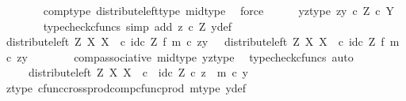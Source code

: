 \begin{isabellebody}
\ \ \ \ \ \ \isamarkupfalse%
\ comp{\isacharunderscore}{\kern0pt}type\ distribute{\isacharunderscore}{\kern0pt}left{\isacharunderscore}{\kern0pt}type\ mid{\isacharunderscore}{\kern0pt}type\ \isamarkupfalse%
\ force\isanewline
\ \ \ \ \isamarkupfalse%
\ yz{\isacharunderscore}{\kern0pt}type{\isacharcolon}{\kern0pt}\ {\isachardoublequoteopen}{\isasymlangle}z{\isacharcomma}{\kern0pt}y{\isasymrangle}\ {\isasymin}\isactrlsub c\ Z\ {\isasymtimes}\isactrlsub c\ Y{\isachardoublequoteclose}\isanewline
\ \ \ \ \ \ \isamarkupfalse%
\ {\isacharparenleft}{\kern0pt}typecheck{\isacharunderscore}{\kern0pt}cfuncs{\isacharcomma}{\kern0pt}\ simp\ add{\isacharcolon}{\kern0pt}\ {\isacartoucheopen}z\ {\isasymin}\isactrlsub c\ Z{\isacartoucheclose}\ y{\isacharunderscore}{\kern0pt}def{\isacharparenright}{\kern0pt}\isanewline
\ \ \ \ \isamarkupfalse%
\ {\isachardoublequoteopen}{\isacharparenleft}{\kern0pt}distribute{\isacharunderscore}{\kern0pt}left\ Z\ X\ X\ \ {\isasymcirc}\isactrlsub c\ {\isacharparenleft}{\kern0pt}id\isactrlsub c\ Z\ {\isasymtimes}\isactrlsub f\ m{\isacharparenright}{\kern0pt}{\isacharparenright}{\kern0pt}\ {\isasymcirc}\isactrlsub c\ {\isasymlangle}z{\isacharcomma}{\kern0pt}y{\isasymrangle}\ \ {\isacharequal}{\kern0pt}\ distribute{\isacharunderscore}{\kern0pt}left\ Z\ X\ X\ \ {\isasymcirc}\isactrlsub c\ {\isacharparenleft}{\kern0pt}id\isactrlsub c\ Z\ {\isasymtimes}\isactrlsub f\ m{\isacharparenright}{\kern0pt}\ {\isasymcirc}\isactrlsub c\ {\isasymlangle}z{\isacharcomma}{\kern0pt}y{\isasymrangle}{\isachardoublequoteclose}\isanewline
\ \ \ \ \ \ \isamarkupfalse%
\ comp{\isacharunderscore}{\kern0pt}associative{}\ mid{\isacharunderscore}{\kern0pt}type\ yz{\isacharunderscore}{\kern0pt}type\ \isamarkupfalse%
\ {\isacharparenleft}{\kern0pt}typecheck{\isacharunderscore}{\kern0pt}cfuncs{\isacharcomma}{\kern0pt}\ auto{\isacharparenright}{\kern0pt}\isanewline
\ \ \ \ \isamarkupfalse%
\ \isamarkupfalse%
\ {\isachardoublequoteopen}{\isachardot}{\kern0pt}{\isachardot}{\kern0pt}{\isachardot}{\kern0pt}\ \ {\isacharequal}{\kern0pt}\ \ distribute{\isacharunderscore}{\kern0pt}left\ Z\ X\ X\ \ {\isasymcirc}\isactrlsub c\ \ {\isasymlangle}id\isactrlsub c\ Z\ {\isasymcirc}\isactrlsub c\ z\ {\isacharcomma}{\kern0pt}\ m\ {\isasymcirc}\isactrlsub c\ y\ {\isasymrangle}{\isachardoublequoteclose}\isanewline
\ \ \ \ \ \ \isamarkupfalse%
\ z{\isacharunderscore}{\kern0pt}type\ cfunc{\isacharunderscore}{\kern0pt}cross{\isacharunderscore}{\kern0pt}prod{\isacharunderscore}{\kern0pt}comp{\isacharunderscore}{\kern0pt}cfunc{\isacharunderscore}{\kern0pt}prod\ m{\isacharunderscore}{\kern0pt}type\ y{\isacharunderscore}{\kern0pt}def\ \isamarkupfalse%

\end{isabellebody}
